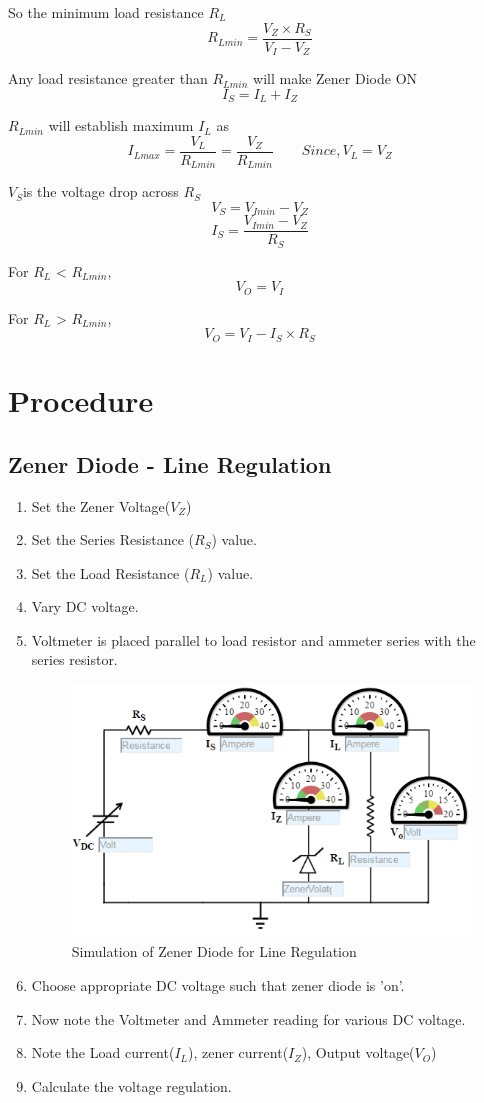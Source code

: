 				So the minimum load resistance \(R_L\)
				$$R_{Lmin} = \frac{V_Z \times R_S}{V_I− V_Z}$$
				
				Any load resistance greater than \(R_{Lmin}\) will make Zener Diode ON
				$$ I_S = I_L + I_Z$$
				
				\(R_{Lmin}\) will establish maximum \(I_L\) as
				$$I_{Lmax}=\frac{V_L}{R_{Lmin}}= \frac{V_Z}{R_{Lmin}} \qquad Since, V_L=V_Z$$
				
				\(V_S\)is the voltage drop across \(R_S\)
				$$V_S = V_{Imin} - V_Z$$
				$$I_S = \frac{V_{Imin}− V_Z}{R_S}$$
				
				For \(R_L\) < \(R_{Lmin}\),
				$$V_O= V_I$$
				
				For \(R_L\) > \(R_{Lmin}\),
				$$V_O = V_I − I_S \times R_S$$
			
		\section{Procedure}
			\subsection{Zener Diode - Line Regulation}
				\begin{enumerate}
					\tightlist
					\item Set the Zener Voltage($V_Z$)
					\item Set the Series Resistance ($R_S$) value.
					\item Set the Load Resistance ($R_L$) value.
					\item Vary DC voltage.
					\item Voltmeter is placed parallel to load resistor and ammeter series with the series resistor.
					\begin{figure}[h]
						\centering
						\includegraphics[width=0.5\linewidth]{img/exp8/5}
						\caption{Simulation of Zener Diode for Line Regulation}
						\label{fig:zener_Procedure_lineRegulation}
					\end{figure}
					\item Choose appropriate DC voltage such that zener diode is 'on'.
					\item Now note the Voltmeter and Ammeter reading for various DC voltage.
					\item Note the Load current($I_L$), zener current($I_Z$), Output voltage($V_O$)
					\item Calculate the voltage regulation.
				\end{enumerate}
			

